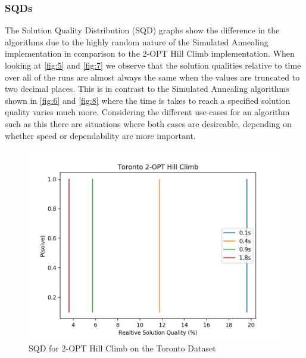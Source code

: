 \documentclass[format=sigconf]{acmart}
\begin{document}
\subsubsection{SQDs}
The Solution Quality Distribution (SQD) graphs show the difference in the algorithms due to the 
highly random nature of the Simulated Annealing implementation in comparison to the 2-OPT Hill Climb 
implementation. When looking at \autoref{fig:5} and \autoref{fig:7} we observe that the solution qualities relative to time over all of 
the runs are almost always the same when the values are truncated to two decimal places. This is in contrast to the 
Simulated Annealing algorithms shown in \autoref{fig:6} and \autoref{fig:8} where the time is takes to reach a specified solution quality 
varies much more. Considering the different use-cases for an algorithm such as this there are situations where both cases are desireable, 
depending on whether speed or dependability are more important.
\begin{figure}[htbp]
    \centerline{\includegraphics[scale=.5]{graphs/Toronto_LS1_SQD.png}}
    \caption{SQD for 2-OPT Hill Climb on the Toronto Dataset}
    \label{fig:5}
\end{figure}
\end{document}
